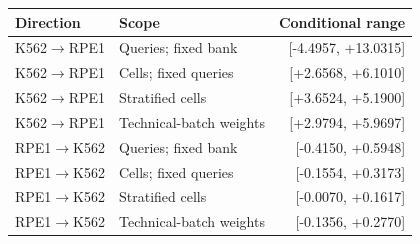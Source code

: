 \begin{tabular}{llr}
\toprule
Direction & Scope & Conditional range \\
\midrule
K562$\to$RPE1 & Queries; fixed bank & [-4.4957, +13.0315] \\
K562$\to$RPE1 & Cells; fixed queries & [+2.6568, +6.1010] \\
K562$\to$RPE1 & Stratified cells & [+3.6524, +5.1900] \\
K562$\to$RPE1 & Technical-batch weights & [+2.9794, +5.9697] \\
RPE1$\to$K562 & Queries; fixed bank & [-0.4150, +0.5948] \\
RPE1$\to$K562 & Cells; fixed queries & [-0.1554, +0.3173] \\
RPE1$\to$K562 & Stratified cells & [-0.0070, +0.1617] \\
RPE1$\to$K562 & Technical-batch weights & [-0.1356, +0.2770] \\
\bottomrule
\end{tabular}
